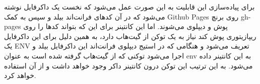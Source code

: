 برای پیاده‌سازی این قابلیت به این صورت عمل می‌شود که نخست یک داکرفایل نوشته می‌شود که در آن کدهای فرانت‌اند بیلد و سپس به کمک
\gls{Github Pages}
روی برنچ gh-pages پوش و دیپلوی می‌شوند. اما این کانتینر برای این که بتواند کدها را روی ریپازیتوری پوش کند نیاز به یک توکن از گیت‌هاب دارد، به همین دلیل برای این داکرفایل یک ENV تعریف می‌شود و هنگامی که در استیج دیپلوی فرانت‌اند این داکرفایل بیلد و اجرا می‌شود توکنی که از گیت‌هاب گرفته شده است به عنوان env به این کانتینر داده می‌شود. به این ترتیب این توکن درون کانتینر داکر وجود خواهد داشت و
از آن استفاده خواهد کرد.

